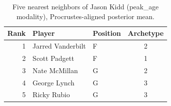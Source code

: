 \begin{table}[htbp]
  \centering\small
  \begin{tabular}{rllc}
    \toprule
    Rank & Player & Position & Archetype \\
    \midrule
    1 & Jarred Vanderbilt & F & 2 \\
    2 & Scott Padgett & F & 1 \\
    3 & Nate McMillan & G & 2 \\
    4 & George Lynch & G & 3 \\
    5 & Ricky Rubio & G & 3 \\
    \bottomrule
  \end{tabular}
  \caption{Five nearest neighbors of Jason Kidd (peak_age modality), Procrustes-aligned posterior mean.}
  \label{tab:Jason_Kidd_neighbors_peak_age}
\end{table}

